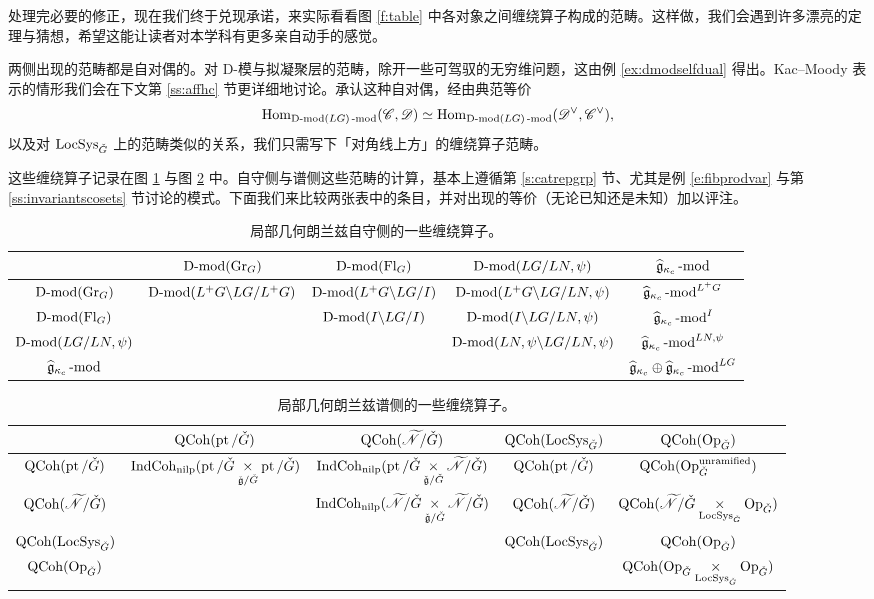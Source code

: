 \ssszh 处理完必要的修正，现在我们终于兑现承诺，来实际看看图 \ref{f:table} 中各对象之间缠绕算子构成的范畴。这样做，我们会遇到许多漂亮的定理与猜想，希望这能让读者对本学科有更多亲自动手的感觉。

两侧出现的范畴都是自对偶的。对 D-模与拟凝聚层的范畴，除开一些可驾驭的无穷维问题，这由例 \ref{ex:dmodselfdual} 得出。Kac--Moody 表示的情形我们会在下文第 \ref{ss:affhc} 节更详细地讨论。承认这种自对偶，经由典范等价
\[
\Hom_{\Dmod(LG)\mod}(\sC, \sD) \simeq \Hom_{\Dmod(LG)\mod}(\sD^\vee, \sC^\vee),
\]
以及对 $\LS$ 上的范畴类似的关系，我们只需写下「对角线上方」的缠绕算子范畴。

这些缠绕算子记录在图 \ref{f:tableaut} 与图 \ref{f:tablespec} 中。自守侧与谱侧这些范畴的计算，基本上遵循第 \ref{s:catrepgrp} 节、尤其是例 \ref{e:fibprodvar} 与第 \ref{ss:invariantscosets} 节讨论的模式。下面我们来比较两张表中的条目，并对出现的等价（无论已知还是未知）加以评注。

\begin{table}[H]
\centering
\scriptsize
\setlength{\tabcolsep}{1.6pt}
\begin{tabular}{|c|c|c|c|c|}
\hline
 & $\Dmod(\Gr_G)$ & $\Dmod(\Fl_G)$ & $\Dmod(LG/LN, \psi)$ & $\fgc\mod$ \\
\hline
$\Dmod(\Gr_G)$ & $\Dmod(L^+G \backslash LG / L^+G)$ & $\Dmod(L^+G
\backslash LG / I)$ & $\Dmod(L^+G \backslash LG / LN, \psi)$ &
$\fgc\mod^{L^+G}$ \\
\hline
$\Dmod(\Fl_G)$ & & $\Dmod(I \backslash LG / I)$ &
$\Dmod(I \backslash LG / LN, \psi)$ & $\fgc\mod^I$ \\
\hline
$\Dmod(LG/LN, \psi)$ & & & $\Dmod(LN, \psi \backslash
LG / LN, \psi)$ & $\fgc\mod^{LN, \psi}$ \\
\hline
$\fgc\mod$ & & & & $\fgc\oplus
\fgc\mod^{LG}$ \\
\hline
\end{tabular}
\caption{局部几何朗兰兹自守侧的一些缠绕算子。}
\label{f:tableaut}
\end{table}

\begin{table}[H]
\centering
\scriptsize
\setlength{\tabcolsep}{1.6pt}
\begin{tabular}{|c|c|c|c|c|}
\hline
 & $\QCoh(\on{pt}/\cG)$ & $\QCoh(\widetilde{\sN} / \cG)$
& $\QCoh(\LS)$ & $\QCoh(\Op)$ \\
\hline
$\QCoh(\on{pt} / \cG)$ & $\ICn( \on{pt} / \cG \underset {\cfg/\cG} \times
\on{pt} / \cG)$ & $\ICn(\on{pt} / \cG \underset { \cfg / \cG} \times
\widetilde{\sN} / \cG)$ & $\QCoh( \on{pt}/ \cG)$ &
$\QCoh( \Op^{\on{unramified}})$ \\
\hline
$\QCoh(\widetilde{\sN} / \cG)$ & & $\ICn( \widetilde{\sN}/ \cG \underset{
\cfg / \cG } \times \widetilde{\sN} / \cG)$ & $\QCoh( \widetilde{\sN}/
\cG)$ & $\QCoh(\widetilde{\sN}/\cG \underset \LS \times \Op)$ \\
\hline
$\QCoh(\LS)$ & & & $\QCoh(\LS)$ & $\QCoh(\Op)$ \\
\hline
$\QCoh(\Op)$ & & & & $\QCoh( \Op \underset \LS \times \Op)$ \\
\hline
\end{tabular}
\caption{局部几何朗兰兹谱侧的一些缠绕算子。}
\label{f:tablespec}
\end{table}

